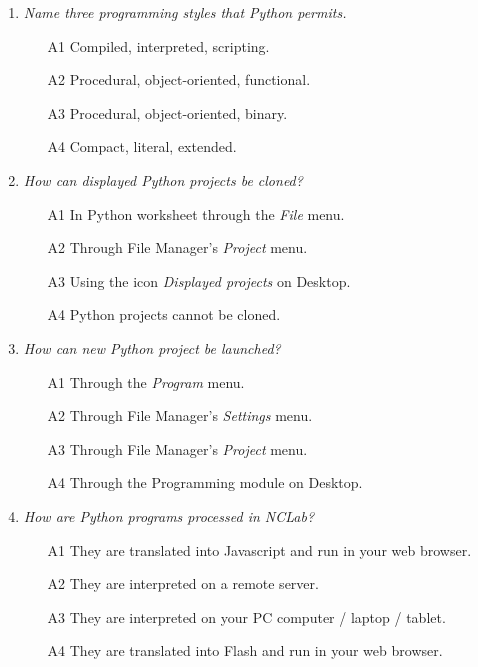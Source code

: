 \begin{enumerate}
\item {\em Name three programming styles that Python permits.}\\

\begin{enumerate}
\item[A1] Compiled, interpreted, scripting.
\item[A2] Procedural, object-oriented, functional.
\item[A3] Procedural, object-oriented, binary.
\item[A4] Compact, literal, extended.
\end{enumerate}
\vspace{4mm}

\item {\em How can displayed Python projects be cloned?}\\

\begin{enumerate}
\item[A1] In Python worksheet through the {\em File} menu.
\item[A2] Through File Manager's {\em Project} menu.
\item[A3] Using the icon {\em Displayed projects} on Desktop.
\item[A4] Python projects cannot be cloned.
\end{enumerate}
\vspace{4mm}

\item {\em How can new Python project be launched?}\\

\begin{enumerate}
\item[A1] Through the {\em Program} menu.
\item[A2] Through File Manager's {\em Settings} menu.
\item[A3] Through File Manager's {\em Project} menu.
\item[A4] Through the Programming module on Desktop.
\end{enumerate}
\vspace{4mm}

\item {\em How are Python programs processed in NCLab?}\\

\begin{enumerate}
\item[A1] They are translated into Javascript and run in your web browser.
\item[A2] They are interpreted on a remote server.
\item[A3] They are interpreted on your PC computer / laptop / tablet.
\item[A4] They are translated into Flash and run in your web browser.
\end{enumerate}
\vspace{4mm}


\end{enumerate}
